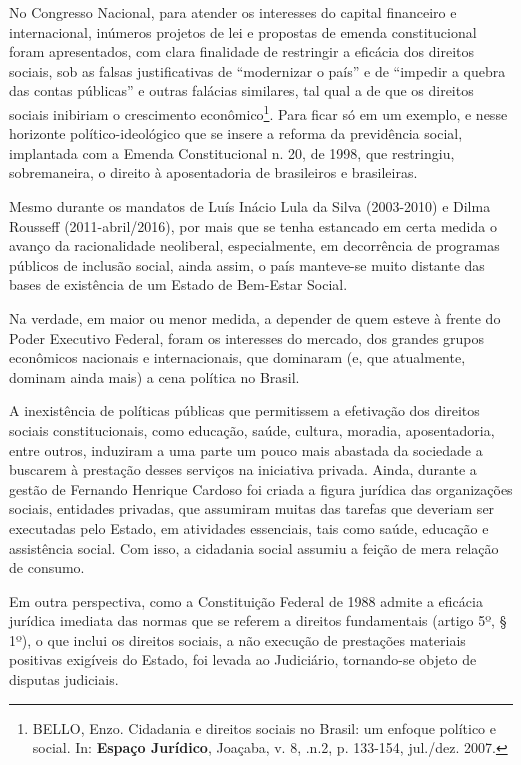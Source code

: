 No Congresso Nacional, para atender os interesses do capital financeiro
e internacional, inúmeros projetos de lei e propostas de emenda
constitucional foram apresentados, com clara finalidade de restringir a
eficácia dos direitos sociais, sob as falsas justificativas de
``modernizar o país'' e de ``impedir a quebra das contas públicas'' e
outras falácias similares, tal qual a de que os direitos sociais
inibiriam o crescimento econômico\footnote{BELLO, Enzo. Cidadania e
  direitos sociais no Brasil: um enfoque político e social. In:
  \textbf{Espaço Jurídico}, Joaçaba, v. 8, .n.2, p. 133-154, jul./dez.
  2007.}. Para ficar só em um exemplo, e nesse horizonte
político-ideológico que se insere a reforma da previdência social,
implantada com a Emenda Constitucional n. 20, de 1998, que restringiu,
sobremaneira, o direito à aposentadoria de brasileiros e brasileiras.

Mesmo durante os mandatos de Luís Inácio Lula da Silva (2003-2010) e
Dilma Rousseff (2011-abril/2016), por mais que se tenha estancado em
certa medida o avanço da racionalidade neoliberal, especialmente, em
decorrência de programas públicos de inclusão social, ainda assim, o
país manteve-se muito distante das bases de existência de um Estado de
Bem-Estar Social.

Na verdade, em maior ou menor medida, a depender de quem esteve à frente
do Poder Executivo Federal, foram os interesses do mercado, dos grandes
grupos econômicos nacionais e internacionais, que dominaram (e, que
atualmente, dominam ainda mais) a cena política no Brasil.

A inexistência de políticas públicas que permitissem a efetivação dos
direitos sociais constitucionais, como educação, saúde, cultura,
moradia, aposentadoria, entre outros, induziram a uma parte um pouco
mais abastada da sociedade a buscarem à prestação desses serviços na
iniciativa privada. Ainda, durante a gestão de Fernando Henrique Cardoso
foi criada a figura jurídica das organizações sociais, entidades
privadas, que assumiram muitas das tarefas que deveriam ser executadas
pelo Estado, em atividades essenciais, tais como saúde, educação e
assistência social. Com isso, a cidadania social assumiu a feição de
mera relação de consumo.

Em outra perspectiva, como a Constituição Federal de 1988 admite a
eficácia jurídica imediata das normas que se referem a direitos
fundamentais (artigo 5º, § 1º), o que inclui os direitos sociais, a não
execução de prestações materiais positivas exigíveis do Estado, foi
levada ao Judiciário, tornando-se objeto de disputas judiciais.

